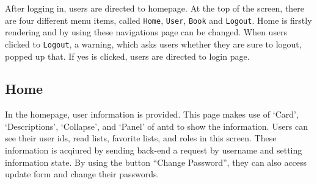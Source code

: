 After logging in, users are directed to homepage. At the top of the screen, there are four different menu items, called \texttt{Home}, \texttt{User}, \texttt{Book} and \texttt{Logout}. Home is firstly rendering and by using these navigations page can be changed. When users clicked to \texttt{Logout}, a warning, which asks users whether they are sure to logout, popped up that. If yes is clicked, users are directed to login page.


\subsection{Home}

In the homepage, user information is provided. This page makes use of `Card', `Descriptions', `Collapse', and `Panel' of antd to show the information. Users can see their user ids, read lists, favorite lists, and roles in this screen. These information is acqiured by sending back-end a request by username and setting information state. By using the button ``Change Password'', they can also access update form and change their passwords.

